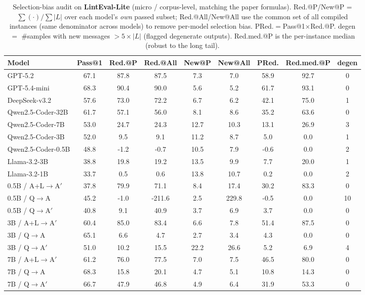 \begin{table}[t]
\centering
\small
\begin{tabular}{lcccccccc}
\toprule
\textbf{Model} & \textbf{Pass@1} & \textbf{Red.@P} & \textbf{Red.@All} & \textbf{New@P} & \textbf{New@All} & \textbf{PRed.} & Red.med.@P & degen\\
\midrule
GPT-5.2 & 67.1 & 87.8 & 87.5 & 7.3 & 7.0 & 58.9 & 92.7 & 0 \\
GPT-5.4-mini & 68.3 & 90.4 & 90.0 & 5.6 & 5.2 & 61.7 & 93.1 & 0 \\
DeepSeek-v3.2 & 57.6 & 73.0 & 72.2 & 6.7 & 6.2 & 42.1 & 75.0 & 1 \\
Qwen2.5-Coder-32B & 61.7 & 57.1 & 56.0 & 8.1 & 8.6 & 35.2 & 63.6 & 0 \\
Qwen2.5-Coder-7B & 53.0 & 24.7 & 24.3 & 12.7 & 10.3 & 13.1 & 26.9 & 3 \\
Qwen2.5-Coder-3B & 52.0 & 9.5 & 9.1 & 11.2 & 8.7 & 5.0 & 0.0 & 1 \\
Qwen2.5-Coder-0.5B & 48.8 & -1.2 & -0.7 & 10.5 & 7.9 & -0.6 & 0.0 & 2 \\
Llama-3.2-3B & 38.8 & 19.8 & 19.2 & 13.5 & 9.9 & 7.7 & 20.0 & 1 \\
Llama-3.2-1B & 33.7 & 0.5 & 0.6 & 13.8 & 10.7 & 0.2 & 0.0 & 2 \\
0.5B / A+L$\rightarrow$A$'$ & 37.8 & 79.9 & 71.1 & 8.4 & 17.4 & 30.2 & 83.3 & 0 \\
0.5B / Q$\rightarrow$A & 45.2 & -1.0 & -211.6 & 2.5 & 229.8 & -0.5 & 0.0 & 10 \\
0.5B / Q$\rightarrow$A$'$ & 40.8 & 9.1 & 40.9 & 3.7 & 6.9 & 3.7 & 0.0 & 0 \\
3B / A+L$\rightarrow$A$'$ & 60.4 & 85.0 & 83.4 & 6.6 & 7.8 & 51.4 & 87.5 & 0 \\
3B / Q$\rightarrow$A & 65.1 & 6.6 & 4.7 & 2.7 & 3.4 & 4.3 & 0.0 & 0 \\
3B / Q$\rightarrow$A$'$ & 51.0 & 10.2 & 15.5 & 22.2 & 26.6 & 5.2 & 6.9 & 4 \\
7B / A+L$\rightarrow$A$'$ & 61.2 & 76.0 & 77.5 & 7.0 & 7.5 & 46.5 & 80.0 & 0 \\
7B / Q$\rightarrow$A & 68.3 & 15.8 & 20.1 & 4.7 & 5.1 & 10.8 & 14.3 & 0 \\
7B / Q$\rightarrow$A$'$ & 66.7 & 47.9 & 46.8 & 4.9 & 6.4 & 31.9 & 53.3 & 0 \\
\bottomrule
\end{tabular}
\caption{Selection-bias audit on \textbf{LintEval-Lite} (micro / corpus-level, matching the paper formulas). Red.@P/New@P = $\sum(\cdot)/\sum|L|$ over each model's \emph{own} passed subset; Red.@All/New@All use the common set of all compiled instances (same denominator across models) to remove per-model selection bias. PRed.$=$Pass@1$\times$Red.@P. degen $=$ \#samples with new messages $>5{\times}|L|$ (flagged degenerate outputs). Red.med.@P is the per-instance median (robust to the long tail).}
\label{tab:selection_bias_atall}
\end{table}